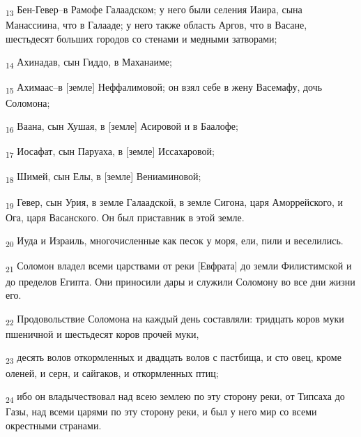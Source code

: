 \begin{tcolorbox}
\textsubscript{13} Бен-Гевер--в Рамофе Галаадском; у него были селения Иаира, сына Манассиина, что в Галааде; у него также область Аргов, что в Васане, шестьдесят больших городов со стенами и медными затворами;
\end{tcolorbox}
\begin{tcolorbox}
\textsubscript{14} Ахинадав, сын Гиддо, в Маханаиме;
\end{tcolorbox}
\begin{tcolorbox}
\textsubscript{15} Ахимаас--в [земле] Неффалимовой; он взял себе в жену Васемафу, дочь Соломона;
\end{tcolorbox}
\begin{tcolorbox}
\textsubscript{16} Ваана, сын Хушая, в [земле] Асировой и в Баалофе;
\end{tcolorbox}
\begin{tcolorbox}
\textsubscript{17} Иосафат, сын Паруаха, в [земле] Иссахаровой;
\end{tcolorbox}
\begin{tcolorbox}
\textsubscript{18} Шимей, сын Елы, в [земле] Вениаминовой;
\end{tcolorbox}
\begin{tcolorbox}
\textsubscript{19} Гевер, сын Урия, в земле Галаадской, в земле Сигона, царя Аморрейского, и Ога, царя Васанского. Он был приставник в этой земле.
\end{tcolorbox}
\begin{tcolorbox}
\textsubscript{20} Иуда и Израиль, многочисленные как песок у моря, ели, пили и веселились.
\end{tcolorbox}
\begin{tcolorbox}
\textsubscript{21} Соломон владел всеми царствами от реки [Евфрата] до земли Филистимской и до пределов Египта. Они приносили дары и служили Соломону во все дни жизни его.
\end{tcolorbox}
\begin{tcolorbox}
\textsubscript{22} Продовольствие Соломона на каждый день составляли: тридцать коров муки пшеничной и шестьдесят коров прочей муки,
\end{tcolorbox}
\begin{tcolorbox}
\textsubscript{23} десять волов откормленных и двадцать волов с пастбища, и сто овец, кроме оленей, и серн, и сайгаков, и откормленных птиц;
\end{tcolorbox}
\begin{tcolorbox}
\textsubscript{24} ибо он владычествовал над всею землею по эту сторону реки, от Типсаха до Газы, над всеми царями по эту сторону реки, и был у него мир со всеми окрестными странами.
\end{tcolorbox}
